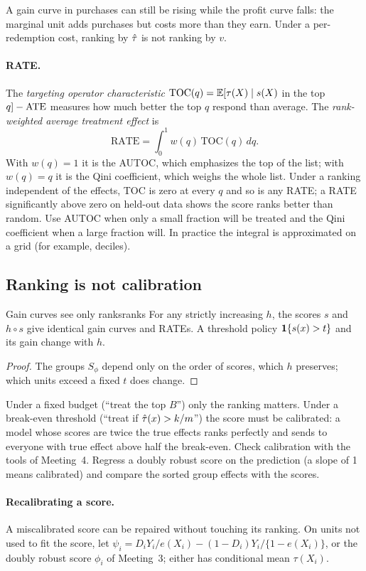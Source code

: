 \documentclass[11pt]{article}
\begin{document}
A gain curve in purchases can still be rising while the profit curve falls: the marginal unit adds purchases but
costs more than they earn. Under a per-redemption cost, ranking by $\hat{\tau}$ is not ranking by $v$.

\paragraph{RATE.} The \emph{targeting operator characteristic} $\text{TOC}(q) = \mathbb{E}[\tau(X) \mid s(X)$ in the top $q] - \text{ATE}$
measures how much better the top $q$ respond than average. The \emph{rank-weighted average treatment effect} is
\[
  \text{RATE} = \int_0^1 w(q)\,\text{TOC}(q)\,dq .
\]
With $w(q) = 1$ it is the AUTOC, which emphasizes the top of the list; with $w(q) = q$ it is the Qini coefficient,
which weighs the whole list. Under a ranking independent of the effects, TOC is zero at every $q$ and so is any
RATE; a RATE significantly above zero on held-out data shows the score ranks better than random. Use AUTOC when
only a small fraction will be treated and the Qini coefficient when a large fraction will. In practice the integral
is approximated on a grid (for example, deciles).

\subsection{Ranking is not calibration}

\begin{prop}{Gain curves see only ranks}{ranks}
For any strictly increasing $h$, the scores $s$ and $h \circ s$ give identical gain curves and RATEs. A threshold
policy $\mathbf{1}\{s(x) > t\}$ and its gain change with $h$.
\end{prop}
\begin{proof}
The groups $S_\phi$ depend only on the order of scores, which $h$ preserves; which units exceed a fixed $t$ does
change.
\end{proof}

Under a fixed budget (``treat the top $B$'') only the ranking matters. Under a break-even threshold
(``treat if $\hat{\tau}(x) > k/m$'') the score must be calibrated: a model whose scores are twice the true effects ranks
perfectly and sends to everyone with true effect above half the break-even. Check calibration with the tools of
Meeting~4. Regress a doubly robust score on the prediction (a slope of 1 means calibrated) and compare the sorted
group effects with the scores.

\paragraph{Recalibrating a score.} A miscalibrated score can be repaired without touching its ranking. On units not used
to fit the score, let $\psi_i = D_iY_i/e(X_i) - (1 - D_i)Y_i/\{1 - e(X_i)\}$, or the doubly robust score $\phi_i$ of Meeting~3; either
has conditional mean $\tau(X_i)$.
\end{document}
